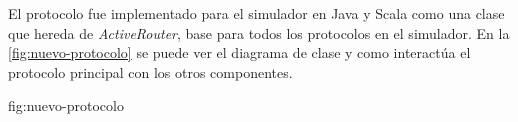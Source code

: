 
El protocolo fue implementado para el simulador \theone{} en Java y Scala como
una clase que hereda de \textit{ActiveRouter}, base para todos los protocolos en
el simulador. En la \ref{fig:nuevo-protocolo} se puede ver el diagrama de clase
y como interactúa el protocolo principal con los otros componentes.

{}{fig:nuevo-protocolo}


